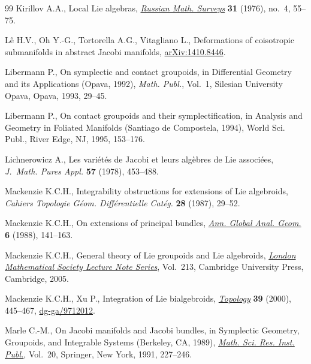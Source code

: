 \documentclass[pdftex]{sigma}
\numberwithin{equation}{section}
\begin{document}
\begin{thebibliography}{99}
Kirillov A.A., Local {L}ie algebras, \href{https://doi.org/10.1070/RM1976v031n04ABEH001556}{\textit{Russian Math. Surveys}} \textbf{31}
 (1976), no.~4, 55--75.

L\^{e} H.V., Oh Y.-G., Tortorella A.G., Vitagliano L., Deformations of
 coisotropic submanifolds in abstract {J}acobi manifolds, \href{https://arxiv.org/abs/1410.8446}{arXiv:1410.8446}.

Libermann P., On symplectic and contact groupoids, in Differential Geometry and
 its Applications ({O}pava, 1992), \textit{Math. Publ.}, Vol.~1, Silesian
 University Opava, Opava, 1993, 29--45.

Libermann P., On contact groupoids and their symplectif\/ication, in Analysis and
 Geometry in Foliated Manifolds ({S}antiago de {C}ompostela, 1994), World Sci.
 Publ., River Edge, NJ, 1995, 153--176.

Lichnerowicz A., Les vari\'et\'es de {J}acobi et leurs alg\`ebres de {L}ie
 associ\'ees, \textit{J.~Math. Pures Appl.} \textbf{57} (1978), 453--488.

Mackenzie K.C.H., Integrability obstructions for extensions of {L}ie algebroids,
 \textit{Cahiers Topologie G\'eom. Diff\'erentielle Cat\'eg.} \textbf{28}
 (1987), 29--52.

Mackenzie K.C.H., On extensions of principal bundles, \href{https://doi.org/10.1007/BF00133036}{\textit{Ann. Global Anal.
 Geom.}} \textbf{6} (1988), 141--163.

Mackenzie K.C.H., General theory of {L}ie groupoids and {L}ie algebroids,
 \href{https://doi.org/10.1017/CBO9781107325883}{\textit{London Mathematical Society Lecture Note Series}}, Vol.~213, Cambridge
 University Press, Cambridge, 2005.

Mackenzie K.C.H., Xu P., Integration of {L}ie bialgebroids, \href{https://doi.org/10.1016/S0040-9383(98)00069-X}{\textit{Topology}}
 \textbf{39} (2000), 445--467, \href{https://arxiv.org/abs/dg-ga/9712012}{dg-ga/9712012}.

Marle C.-M., On {J}acobi manifolds and {J}acobi bundles, in Symplectic Geometry,
 Groupoids, and Integrable Systems ({B}erkeley, {CA}, 1989), \href{https://doi.org/10.1007/978-1-4613-9719-9_16}{\textit{Math.
 Sci. Res. Inst. Publ.}}, Vol.~20, Springer, New York, 1991, 227--246.


\end{thebibliography}
\end{document}
